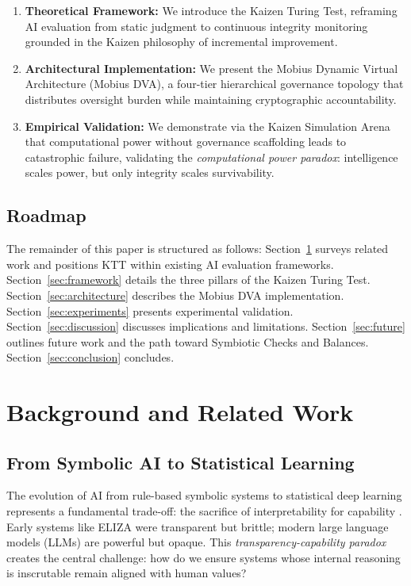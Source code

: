 \documentclass[11pt,letterpaper]{article}
\begin{document}
\begin{enumerate}
    \item \textbf{Theoretical Framework:} We introduce the Kaizen Turing Test, reframing AI evaluation from static judgment to continuous integrity monitoring grounded in the Kaizen philosophy of incremental improvement.
    
    \item \textbf{Architectural Implementation:} We present the Mobius Dynamic Virtual Architecture (Mobius DVA), a four-tier hierarchical governance topology that distributes oversight burden while maintaining cryptographic accountability.
    
    \item \textbf{Empirical Validation:} We demonstrate via the Kaizen Simulation Arena that computational power without governance scaffolding leads to catastrophic failure, validating the \textit{computational power paradox}: intelligence scales power, but only integrity scales survivability.
\end{enumerate}

\subsection{Roadmap}

The remainder of this paper is structured as follows: Section~\ref{sec:background} surveys related work and positions KTT within existing AI evaluation frameworks. Section~\ref{sec:framework} details the three pillars of the Kaizen Turing Test. Section~\ref{sec:architecture} describes the Mobius DVA implementation. Section~\ref{sec:experiments} presents experimental validation. Section~\ref{sec:discussion} discusses implications and limitations. Section~\ref{sec:future} outlines future work and the path toward Symbiotic Checks and Balances. Section~\ref{sec:conclusion} concludes.

\section{Background and Related Work}
\label{sec:background}

\subsection{From Symbolic AI to Statistical Learning}

The evolution of AI from rule-based symbolic systems to statistical deep learning represents a fundamental trade-off: the sacrifice of interpretability for capability \citep{goodfellow2016deep}. Early systems like ELIZA \citep{weizenbaum1966eliza} were transparent but brittle; modern large language models (LLMs) are powerful but opaque. This \textit{transparency-capability paradox} creates the central challenge: how do we ensure systems whose internal reasoning is inscrutable remain aligned with human values?
\end{document}
